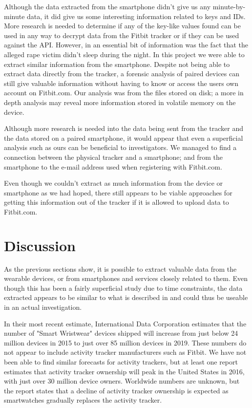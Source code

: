 \documentclass[a4paper,11pt,dvips]{article}
\begin{document}
Although the data extracted from the smartphone didn’t give us any minute-by-minute data, it did give us some interesting information related to keys and IDs. More research is needed to determine if any of the key-like values found can be used in any way to decrypt data from the Fitbit tracker or if they can be used against the API. However, in \cite{Snyder:2015} an essential bit of information was the fact that the alleged rape victim didn’t sleep during the night. In this project we were able to extract similar information from the smartphone. Despite not being able to extract data directly from the tracker, a forensic analysis of paired devices can still give valuable information without having to know or access the users own account on Fitbit.com. Our analysis was from the files stored on disk; a more in depth analysis may reveal more information stored in volatile memory on the device.

Although more research is needed into the data being sent from the tracker and the data stored on a paired smartphone, it would appear that even a superficial analysis such as ours can be beneficial to investigators. We managed to find a connection between the physical tracker and a smartphone; and from the smartphone to the e-mail address used when registering with Fitbit.com.

Even though we couldn’t extract as much information from the device or smartphone as we had hoped, there still appears to be viable approaches for getting this information out of the tracker if it is allowed to upload data to Fitbit.com.


\section{Discussion}

As the previous sections show, it is possible to extract valuable data from the wearable devices, or from smartphones and services closely related to them. Even though this has been a fairly superficial study due to time constraints, the data extracted appears to be similar to what is described in \cite{Snyder:2015} and could thus be useable in an actual investigation. 

In their most recent estimate, International Data Corporation estimates that the number of "Smart Wristwear" devices shipped will increase from just below 24 million devices in 2015 to just over 85 million devices in 2019. These numbers do not appear to include activity tracker manufacturers such as Fitbit. \cite{idc2015} We have not been able to find similar forecasts for activity trackers, but at least one report estimates that activity tracker ownership will peak in the United States in 2016, with just over 30 million device owners. Worldwide numbers are unknown, but the report states that a decline of activity tracker ownership is expected as smartwatches gradually replaces the activity tracker. \cite{npd2015}
\end{document}
